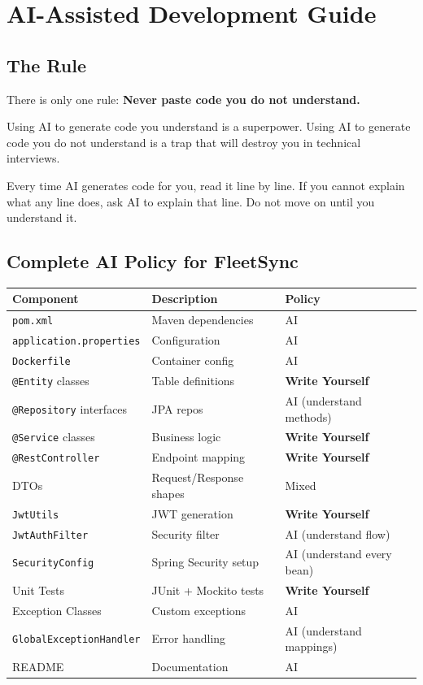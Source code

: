 \documentclass[12pt,a4paper]{report}
\newcommand{\code}[1]{\texttt{\textcolor{keywordblue}{#1}}}
\begin{document}
\chapter{AI-Assisted Development Guide}

\section{The Rule}

\begin{tcolorbox}[warnbox]
There is only one rule: \textbf{Never paste code you do not understand.}

Using AI to generate code you understand is a superpower. Using AI to generate code you do not understand is a trap that will destroy you in technical interviews.

Every time AI generates code for you, read it line by line. If you cannot explain what any line does, ask AI to explain that line. Do not move on until you understand it.
\end{tcolorbox}

\section{Complete AI Policy for FleetSync}

\begin{tabularx}{\textwidth}{@{}lXl@{}}
\toprule
\textbf{Component} & \textbf{Description} & \textbf{Policy} \\
\midrule
\code{pom.xml} & Maven dependencies & AI \\
\code{application.properties} & Configuration & AI \\
\code{Dockerfile} & Container config & AI \\
\code{@Entity} classes & Table definitions & \textbf{Write Yourself} \\
\code{@Repository} interfaces & JPA repos & AI (understand methods) \\
\code{@Service} classes & Business logic & \textbf{Write Yourself} \\
\code{@RestController} & Endpoint mapping & \textbf{Write Yourself} \\
DTOs & Request/Response shapes & Mixed \\
\code{JwtUtils} & JWT generation & \textbf{Write Yourself} \\
\code{JwtAuthFilter} & Security filter & AI (understand flow) \\
\code{SecurityConfig} & Spring Security setup & AI (understand every bean) \\
Unit Tests & JUnit + Mockito tests & \textbf{Write Yourself} \\
Exception Classes & Custom exceptions & AI \\
\code{GlobalExceptionHandler} & Error handling & AI (understand mappings) \\
README & Documentation & AI \\
\bottomrule
\end{tabularx}
\end{document}
